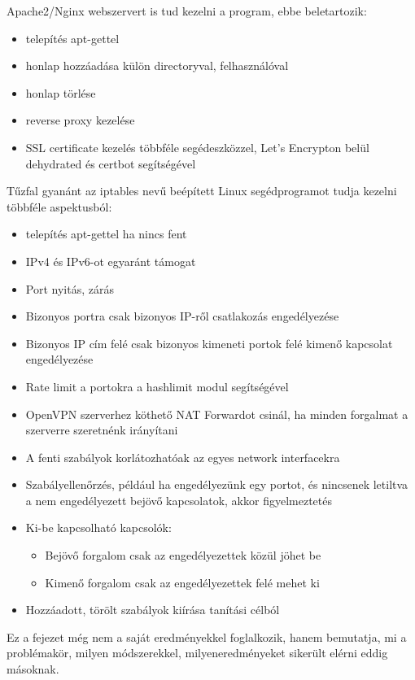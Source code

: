 Apache2/Nginx webszervert is tud kezelni a program, ebbe beletartozik:

\begin{itemize}
	\item telepítés apt-gettel
	\item honlap hozzáadása külön directoryval, felhasználóval
	\item honlap törlése
	\item reverse proxy kezelése
	\item SSL certificate kezelés többféle segédeszközzel, Let's Encrypton belül dehydrated és certbot segítségével
\end{itemize}

Tűzfal gyanánt az iptables nevű beépített Linux segédprogramot tudja kezelni többféle aspektusból:
\begin{itemize}
	\item telepítés apt-gettel ha nincs fent
	\item IPv4 és IPv6-ot egyaránt támogat
	\item Port nyitás, zárás
	\item Bizonyos portra csak bizonyos IP-ről csatlakozás engedélyezése
	\item Bizonyos IP cím felé csak bizonyos kimeneti portok felé kimenő kapcsolat engedélyezése
	\item Rate limit a portokra a hashlimit modul segítségével
	\item OpenVPN szerverhez köthető NAT Forwardot csinál, ha minden forgalmat a szerverre szeretnénk irányítani
	\item A fenti szabályok korlátozhatóak az egyes network interfacekra
	\item Szabályellenőrzés, például ha engedélyezünk egy portot, és nincsenek letiltva a nem engedélyezett bejövő kapcsolatok, akkor figyelmeztetés
	\item Ki-be kapcsolható kapcsolók:
		\begin{itemize}
			\item Bejövő forgalom csak az engedélyezettek közül jöhet be
			\item Kimenő forgalom csak az engedélyezettek felé mehet ki
		\end{itemize}
	\item Hozzáadott, törölt szabályok kiírása tanítási célból
\end{itemize}


Ez a fejezet még nem a saját eredményekkel foglalkozik, hanem bemutatja, mi a problémakör, milyen módszerekkel, milyeneredményeket sikerült elérni eddig másoknak.

